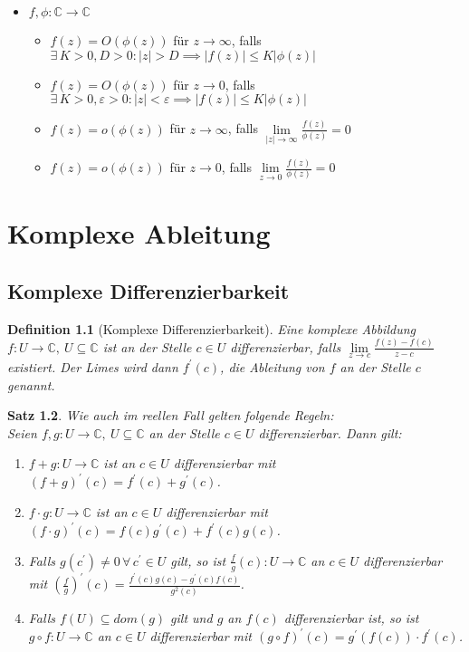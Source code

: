 \documentclass[a4paper,12pt]{book}
\renewcommand{\epsilon}{\varepsilon}
\theoremstyle{newthm}
\newtheorem{thm}{Satz}[section]
\theoremstyle{newdef}
\newtheorem{defn}[thm]{Definition}
\theoremstyle{newrem}
\newcommand{\C}{\mathbb{C}}
\begin{document}
\begin{itemize}
			\item $ f,\phi: \C \to \C $
				\begin{itemize}
					\item $ f(z) = O(\phi(z)) $ für $ z \to \infty $, falls $ \exists\, K>0, D>0: |z|>D \implies |f(z)| \leq K|\phi(z)| $
					\item $ f(z) = O(\phi(z)) $ für $ z \to 0 $, falls $ \exists\, K>0,\epsilon>0: |z|<\epsilon \implies |f(z)| \leq K|\phi(z)| $
					\item $ f(z) = o(\phi(z)) $ für $ z \to \infty $, falls $ \lim\limits_{|z| \to \infty} \frac{f(z)}{\phi(z)} = 0 $
					\item $ f(z) = o(\phi(z)) $ für $ z \to 0 $, falls $ \lim\limits_{z \to 0} \frac{f(z)}{\phi(z)} = 0 $
				\end{itemize}
		\end{itemize}



\chapter{Komplexe Ableitung}
	
	\section{Komplexe Differenzierbarkeit}
		
		\begin{defn}[Komplexe Differenzierbarkeit]
			Eine komplexe Abbildung $ f: U \to \C,\ U \subseteq \C $ ist an der Stelle $ c \in U $ \emph{differenzierbar}, falls $ \lim\limits_{z \to c} \frac{f(z)-f(c)}{z-c} $ existiert. Der Limes wird dann $ f^\prime(c) $, die \emph{Ableitung von $f$ an der Stelle $c$} genannt.
		\end{defn}
		
		\begin{thm}
			Wie auch im reellen Fall gelten folgende Regeln:\\
			Seien $ f,g: U \to \C,\ U \subseteq \C $ an der Stelle $ c \in U $ differenzierbar. Dann gilt:
			\begin{enumerate}[label={\roman*})]
				\item $ f+g: U \to \C $ ist an $ c \in U $ differenzierbar mit $ (f+g)^\prime(c) = f^\prime(c) + g^\prime(c) $.
				\item $ f\cdot g: U \to \C $ ist an $ c \in U $ differenzierbar mit $ (f\cdot g)^\prime(c) = f(c) g^\prime(c) + f^\prime(c) g(c) $.
				\item Falls $ g(c^\prime) \neq 0\, \forall\, c^\prime \in U $ gilt, so ist $ \frac{f}{g}(c): U \to \C $ an $ c \in U $ differenzierbar mit $ \left(\frac{f}{g}\right)^\prime(c) = \frac{f^\prime(c)g(c) - g^\prime(c)f(c)}{g^2(c)} $.
				\item Falls $ f(U) \subseteq dom(g) $ gilt und $g$ an $f(c)$ differenzierbar ist, so ist $ g \circ f: U \to \C $ an $ c \in U $ differenzierbar mit $ (g\circ f)^\prime(c) = g^\prime(f(c)) \cdot f^\prime(c) $.
			\end{enumerate}
		\end{thm}
		
\end{document}
